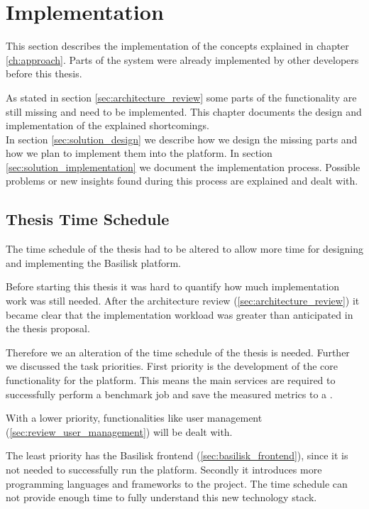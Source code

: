 \chapter{Implementation}
\label{ch:implementation}



This section describes the implementation of the concepts explained in chapter \ref{ch:approach}.
Parts of the system were already implemented by other developers before this thesis.

As stated in section \ref{sec:architecture_review} some parts of the functionality are still missing and need to be implemented.
This chapter documents the design and implementation of the explained shortcomings.
\\

In section \ref{sec:solution_design} we describe how we design the missing parts and how we plan to implement them into the platform.
In section \ref{sec:solution_implementation} we document the implementation process.
Possible problems or new insights found during this process are explained and dealt with.






\section{Thesis Time Schedule}
\label{sec:time_schedule}
The time schedule of the thesis had to be altered to allow more time for designing and implementing the Basilisk platform.

Before starting this thesis it was hard to quantify how much implementation work was still needed.
After the architecture review (\ref{sec:architecture_review}) it became clear that the implementation workload was greater than anticipated in the thesis proposal.

Therefore we an alteration of the time schedule of the thesis is needed.
Further we discussed the task priorities.
First priority is the development of the core functionality for the platform.
This means the main services are required to successfully perform a benchmark job and save the measured metrics to a \ts{}.

With a lower priority, functionalities like user management (\ref{sec:review_user_management}) will be dealt with.

The least priority has the Basilisk frontend (\ref{sec:basilisk_frontend}), since it is not needed to successfully run the platform.
Secondly it introduces more programming languages and frameworks to the project.
The time schedule can not provide enough time to fully understand this new technology stack.




